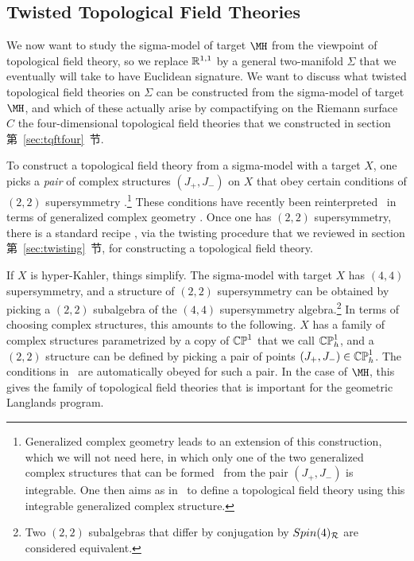
\subsection{Twisted Topological Field Theories}

\label{sec:twistedtft}

We now want to study the sigma-model of target $\MH$ from the
viewpoint of topological field theory, so we replace
$\Bbb{R}^{1,1}$ by a general two-manifold $\Sigma$ that we
eventually will take to have Euclidean signature. We want to
discuss what twisted topological field theories on $\Sigma$ can be
constructed from the sigma-model of target $\MH$, and which of
these actually arise by compactifying on the Riemann surface $C$
the four-dimensional topological field theories that we
constructed in section 第~\ref{sec:tqftfour}~节.

 
 

 

 
 

To construct a topological field theory from a sigma-model with a
target $X$, one picks a {\it pair} of complex structures
$(J_+,J_-)$ on $X$ that obey certain conditions of $(2,2)$
supersymmetry \cite{ref66}.\footnote{Generalized complex geometry leads to an
extension of this construction, which we will not need here, in
which only one of the two generalized complex structures that can
be formed \cite{ref67}\ from the pair $(J_+,J_-)$ is integrable.
One then aims as in \cite{ref68}\ to define a topological field theory using
this  integrable generalized complex structure.}
These conditions have recently
been reinterpreted \cite{ref67}\ in terms of generalized complex
geometry \cite{ref69}. Once one has $(2,2)$ supersymmetry, there is a
standard recipe \cite{ref70}, via the twisting procedure that we
reviewed in section 第~\ref{sec:twisting}~节, for constructing a topological
field theory.

If $X$ is hyper-Kahler, things simplify. The sigma-model with
target $X$ has $(4,4)$ supersymmetry, and a structure of $(2,2)$
supersymmetry can be obtained by picking a $(2,2)$ subalgebra of
the $(4,4)$ supersymmetry algebra.\footnote{Two $(2,2)$ subalgebras
that differ by conjugation by $Spin(4)_{\cal R}$ are considered
equivalent.} In terms of choosing complex structures, this amounts
to the following.  $X$ has a family of complex structures
parametrized by a copy of $\Bbb{CP}^1$ that we call
$\Bbb{CP}^1_h$, and a $(2,2)$ structure can be defined by picking
a pair of points $(J_+,J_-)\in \Bbb{CP}_h^1$. The conditions in
\cite{ref66}\ are automatically obeyed for such a pair. In the case of
$\MH$, this gives the family of topological field theories that is
important for the geometric Langlands program.

